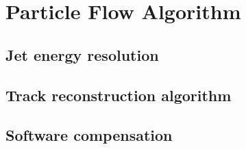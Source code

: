 \chapter{Particle Flow Algorithm}

\section{Jet energy resolution}

\section{Track reconstruction algorithm}

\section{Software compensation}
